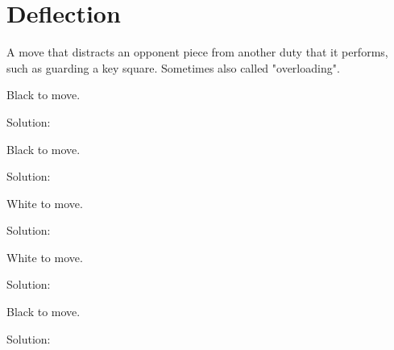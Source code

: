 \documentclass{book}
\begin{document}
\section{Deflection}
A move that distracts an opponent piece from another duty that it performs, such as guarding a key square. Sometimes also called "overloading".\begin{multicols}{2} 
\begin{samepage} 
\newgame 


 
\showboard
 
 Black to move. 
 
Solution: 
 
\end{samepage}\begin{samepage} 
\newgame 


 
\showboard
 
 Black to move. 
 
Solution: 
 
\end{samepage}\begin{samepage} 
\newgame 


 
\showboard
 
 White to move. 
 
Solution: 
 
\end{samepage}\begin{samepage} 
\newgame 


 
\showboard
 
 White to move. 
 
Solution: 
 
\end{samepage}\begin{samepage} 
\newgame 


 
\showboard
 
 Black to move. 
 
Solution: 
 
\end{samepage}\end{multicols} 
\newpage 
\end{document}
